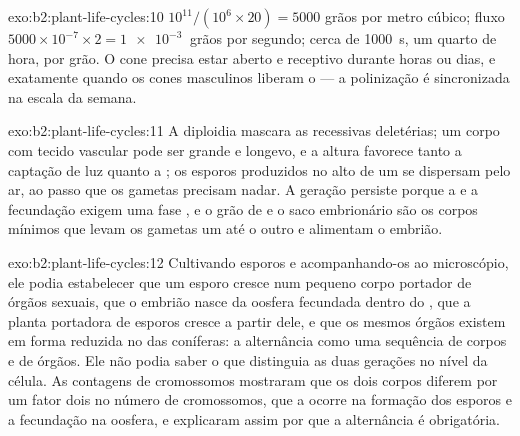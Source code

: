\begin{solution}{exo:b2:plant-life-cycles:10}
$10^{11}/(10^{6}\times 20) = \num{5000}$ grãos por metro cúbico; fluxo
$5000\times 10^{-7}\times 2 = \qty{1e-3}{}$ grãos por segundo; cerca de
\qty{1000}{s}, um quarto de hora, por grão. O cone precisa estar aberto
e receptivo durante horas ou dias, e exatamente quando os cones
masculinos liberam o  --- a polinização é sincronizada na escala
da semana.
\end{solution}

\begin{solution}{exo:b2:plant-life-cycles:11}
A diploidia mascara as  recessivas deletérias; um corpo
 com tecido vascular pode ser grande e longevo, e a altura
favorece tanto a captação de luz quanto a ; os
esporos produzidos no alto de um  se dispersam pelo ar, ao
passo que os gametas precisam nadar. A geração  persiste
porque a  e a fecundação exigem uma fase , e o grão de
 e o saco embrionário são os corpos mínimos que levam os gametas
um até o outro e alimentam o embrião.
\end{solution}

\begin{solution}{exo:b2:plant-life-cycles:12}
Cultivando esporos e acompanhando-os ao microscópio, ele podia
estabelecer que um esporo cresce num pequeno corpo portador de órgãos
sexuais, que o embrião nasce da oosfera fecundada dentro do
, que a planta portadora de esporos cresce a partir dele, e
que os mesmos órgãos existem em forma reduzida no  das coníferas:
a alternância como uma sequência de corpos e de órgãos. Ele não podia
saber o que distinguia as duas gerações no nível da célula. As
contagens de cromossomos mostraram que os dois corpos diferem por um
fator dois no número de cromossomos, que a  ocorre na formação
dos esporos e a fecundação na oosfera, e explicaram assim por que a
alternância é obrigatória.
\end{solution}

